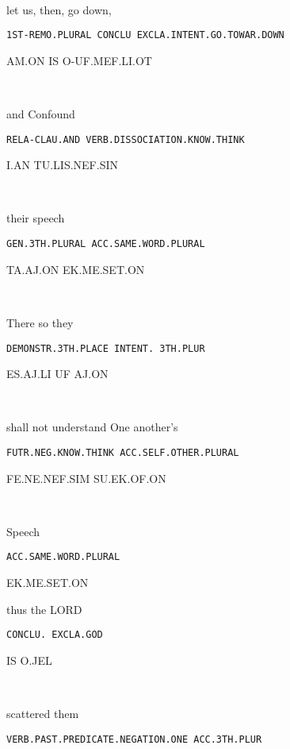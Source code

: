 {\ap~\ta\aj\on~\Atlanmu\Atlanto\jam
\drie

  

let us, then, go down, 			      	 

{\tt 1ST-REMO.PLURAL CONCLU EXCLA.INTENT.GO.TOWAR.DOWN             }

AM.ON	IS	 O-UF.MEF.LI.OT				 

\am\on~\is~\Atlano\uf\mef\li\ot
\drie
 

and  			Confound 

{\tt RELA-CLAU.AND	VERB.DISSOCIATION.KNOW.THINK }

I.AN			TU.LIS.NEF.SIN      

\Atlani\an~\tu\lis\nef\Atlansin
\drie

  

their 			speech

{\tt GEN.3TH.PLURAL             ACC.SAME.WORD.PLURAL	 	}

TA.AJ.ON		EK.ME.SET.ON 

\ta\aj\on~\ek\me\set\on

\drie

  

There			so 			they 		

{\tt DEMONSTR.3TH.PLACE        INTENT.		3TH.PLUR	 }

ES.AJ.LI				UF		AJ.ON				 

\es\aj\li~\uf~\aj\on

\drie


shall not understand 		One another’s 

{\tt FUTR.NEG.KNOW.THINK		ACC.SELF.OTHER.PLURAL }

FE.NE.NEF.SIM			SU.EK.OF.ON	 

\fe\Atlanne\nef\Atlansim~\su\ek\of\on
\drie

  

Speech 

{\tt ACC.SAME.WORD.PLURAL }

EK.ME.SET.ON 

\ek\me\set\on
\drie

 

thus 		the LORD 					

{\tt CONCLU.	EXCLA.GOD					 }

IS		O.JEL		 

\is~\Atlano\jel 
\drie

 

scattered				them 

{\tt VERB.PAST.PREDICATE.NEGATION.ONE	ACC.3TH.PLUR }

}

